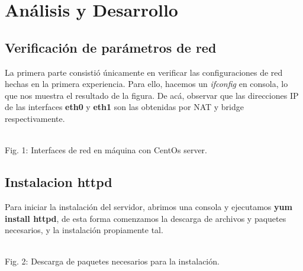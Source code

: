 \documentclass[11pt]{article}
\begin{document}
\section{Análisis y Desarrollo}
\subsection{Verificación de parámetros de red}
La primera parte consistió únicamente en verificar las configuraciones de red hechas en la primera experiencia. Para ello, hacemos un \textit{ifconfig} en consola, lo que nos muestra el resultado de la figura. De acá, observar que las direcciones IP de las interfaces \textbf{eth0} y \textbf{eth1} son las obtenidas por NAT y bridge respectivamente.\\

\begin{minipage}[t]{\linewidth}
    \raggedright
\medskip
     \\Fig. 1: Interfaces de red en máquina con CentOs server.
\end{minipage}
\newpage
\subsection{Instalacion httpd}
Para iniciar la instalación del servidor, abrimos una consola y ejecutamos \textbf{yum install httpd}, de esta forma comenzamos la descarga de archivos y paquetes necesarios, y la instalación propiamente tal.

\begin{minipage}[t]{\linewidth}
    \raggedright
\medskip
     \\Fig. 2: Descarga de paquetes necesarios para la instalación.\\
\end{minipage}
\end{document}
